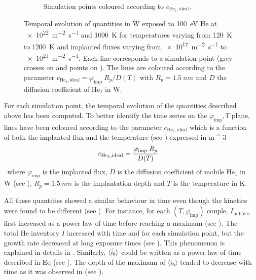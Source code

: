 \begin{figure} [ht!]
\begin{subfigure}{0.5\linewidth}
        \caption{Simulation points coloured according to $c_{\mathrm{He}_1, \mathrm{ideal}}$.}
    \end{subfigure}
    \caption{Temporal evolution of quantities in W exposed to \SI{100}{eV} He at \SI{e22}{m^{-2}.s^{-1}} and \SI{1000}{K} for temperatures varying from \SI{120}{K} to \SI{1200}{K} and implanted fluxes varying from \SI{e17}{m^{-2}s^{-1}} to \SI{e21}{m^{-2}s^{-1}}. Each line corresponds to a simulation point (grey crosses on  and points on ). The lines are coloured according to the parameter $c_{\mathrm{He}_1, \mathrm{ideal}} = \varphi_\mathrm{imp} \; R_p/D(T)$ with $R_p = \SI{1.5}{nm}$ and $D$ the diffusion coefficient of $\mathrm{He}_1$ in W.}
\end{figure}

For each simulation point, the temporal evolution of the quantities described above has been computed.
To better identify the time series on the $\varphi_\mathrm{imp}, T$ plane, lines have been coloured according to the parameter $c_{\mathrm{He}_1, \mathrm{ideal}}$ which is a function of both the implanted flux and the temperature (see ) expressed in \si{m ^{-3}}.

\begin{equation}
    c_{\mathrm{He}_1, \mathrm{ideal}} = \frac{\varphi_\mathrm{imp} \; R_p}{D(T)}
    \labeq{c he1 ideal}
\end{equation}
where $\varphi_\mathrm{imp}$ is the implanted flux, $D$ is the diffusion coefficient of mobile $\mathrm{He}_1$ in W (see ), $R_p = \SI{1.5}{nm}$ is the implantation depth and $T$ is the temperature in \si{K}.

All these quantities showed a similar behaviour in time even though the kinetics were found to be different (see ).
For instance, for each $(T, \varphi_\mathrm{imp})$ couple, $I_\mathrm{bubbles}$ first increased as a power law of time before reaching a maximum (see ).
The total He inventory $I$ increased with time and for each simulation point, but the growth rate decreased at long exposure times (see ).
This phenomenon is explained in details in .
Similarly, $\Bar{\langle i_b \rangle}$ could be written as a power law of time described in Eq  (see ).
The depth of the maximum of $\langle i_b \rangle$ tended to decrease with time as it was observed in  (see ).

